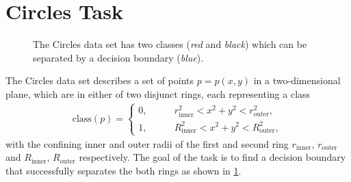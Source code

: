 




\section{Circles Task}
\label{circlestask}
\begin{figure}
	\centering
	\vspace{-0.6cm}
	
	\caption[Circles data set.]{The Circles data set has two classes (\textit{red} and \textit{black}) which can be separated by a decision boundary (\textit{blue}).} 
	\label{circlestasksketch}
	\vspace{-1cm}
\end{figure}
The Circles data set describes a set of points $p = p(x,y)$ in a two-dimensional plane, which are in either of two disjunct rings, each representing a class
\begin{align}
\text{class}(p) =
\begin{cases}
0 ,&\quad \quad r_{\text{inner}}^2 < x^2 + y^2 < r_{\text{outer}}^2, \\
1 ,&\quad \quad R_{\text{inner}}^2 < x^2 + y^2 < R_{\text{outer}}^2,
\end{cases}
\end{align}
with the confining inner and outer radii of the first and second ring $r_{\text{inner}}$, $r_{\text{outer}}$ and  $R_{\text{inner}}$, $R_{\text{outer}}$ respectively. The goal of the task is to find a decision boundary that successfully separates the both rings as shown in \cref{circlestasksketch}.

